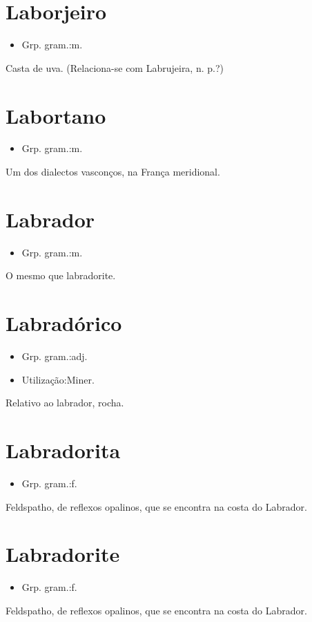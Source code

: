\section{Laborjeiro}
\begin{itemize}
\item {Grp. gram.:m.}
\end{itemize}
Casta de uva.
(Relaciona-se com \textunderscore Labrujeira\textunderscore , n. p.?)
\section{Labortano}
\begin{itemize}
\item {Grp. gram.:m.}
\end{itemize}
Um dos dialectos vasconços, na França meridional.
\section{Labrador}
\begin{itemize}
\item {Grp. gram.:m.}
\end{itemize}
O mesmo que \textunderscore labradorite\textunderscore .
\section{Labradórico}
\begin{itemize}
\item {Grp. gram.:adj.}
\end{itemize}
\begin{itemize}
\item {Utilização:Miner.}
\end{itemize}
Relativo ao labrador, rocha.
\section{Labradorita}
\begin{itemize}
\item {Grp. gram.:f.}
\end{itemize}
Feldspatho, de reflexos opalinos, que se encontra na costa do Labrador.
\section{Labradorite}
\begin{itemize}
\item {Grp. gram.:f.}
\end{itemize}
Feldspatho, de reflexos opalinos, que se encontra na costa do Labrador.
